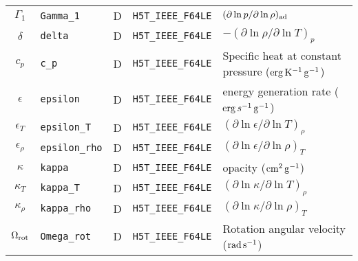 \documentclass{article}
\newcommand{\cm}{\ensuremath{{\rm cm}}}
\newcommand{\gram}{\ensuremath{{\rm g}}}
\newcommand{\second}{\ensuremath{{\rm s}}}
\newcommand{\erg}{\ensuremath{{\rm erg}}}
\newcommand{\kelvin}{\ensuremath{{\rm K}}}
\begin{document}
\begin{table}[h!]
\begin{tabular}{|c|l|c|l|l|}
$\Gamma_{1}$      & \texttt{Gamma\_1}      & D & \texttt{H5T\_IEEE\_F64LE} & $(\partial \ln p/\partial \ln \rho)_{\rm ad}$ \\
$\delta$      & \texttt{delta}            & D & \texttt{H5T\_IEEE\_F64LE} & $-(\partial \ln \rho/\partial \ln T)_{p}$  \\
$c_{p}$           & \texttt{c\_p}          & D &  \texttt{H5T\_IEEE\_F64LE} & Specific heat at constant pressure ($\erg\,\kelvin^{-1}\,\gram^{-1}$) \\
$\epsilon$        & \texttt{epsilon}      & D &  \texttt{H5T\_IEEE\_F64LE} & energy generation rate ($\erg\,s^{-1}\,\gram^{-1}$) \\
$\epsilon_{T}$    & \texttt{epsilon\_T}   & D &  \texttt{H5T\_IEEE\_F64LE} & $(\partial \ln \epsilon/\partial \ln T)_{\rho}$ \\
$\epsilon_{\rho}$ & \texttt{epsilon\_rho} & D &  \texttt{H5T\_IEEE\_F64LE} & $(\partial \ln \epsilon/\partial \ln \rho)_{T}$ \\
$\kappa$          & \texttt{kappa}       & D &  \texttt{H5T\_IEEE\_F64LE} & opacity ($\cm^{2}\,\gram^{-1}$) \\
$\kappa_{T}$      & \texttt{kappa\_T}     & D &  \texttt{H5T\_IEEE\_F64LE} & $(\partial \ln \kappa/\partial \ln T)_{\rho}$ \\
$\kappa_{\rho}$   & \texttt{kappa\_rho}   & D &  \texttt{H5T\_IEEE\_F64LE} & $(\partial \ln \kappa/\partial \ln \rho)_{T}$ \\
$\Omega_{\rm rot}$ & \texttt{Omega\_rot}   & D & \texttt{H5T\_IEEE\_F64LE} & Rotation angular velocity (${\rm rad}\,\second^{-1}$) \\  \hline
\end{tabular}
\end{table}
\end{document}
